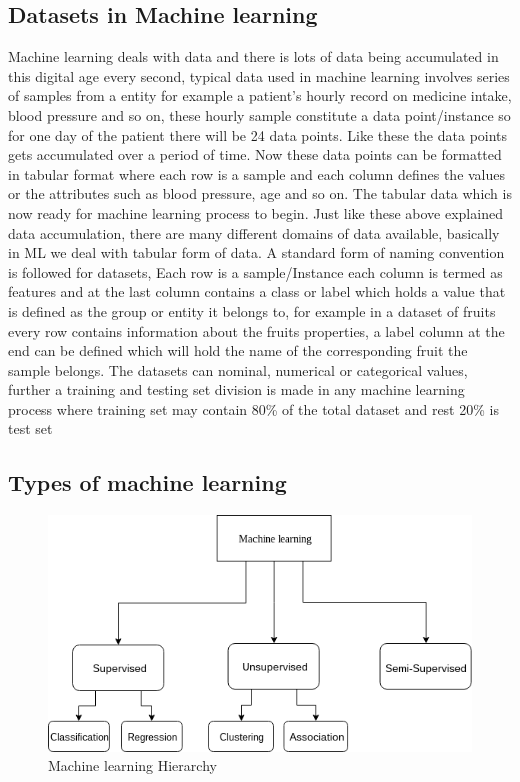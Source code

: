 \subsection{Datasets in Machine learning}
Machine learning deals with data and there is lots of data being accumulated in this digital age every second, typical data used in machine learning involves series of samples from a entity for example a patient's hourly record on medicine intake, blood pressure and so on, these hourly sample constitute a data point/instance so for one day of the patient there will be 24 data points. Like these the data points gets accumulated over a period of time. Now these data points can be formatted in tabular format where each row is a sample and each column defines the values or the attributes such as blood pressure, age and so on. The tabular data which is now ready for machine learning process to begin. Just like these above explained data accumulation, there are many different domains of data available, basically in ML we deal with tabular form of data. A standard form of naming convention is followed for datasets, Each row is a sample/Instance each column is termed as features and at the last column contains a class or label which holds a value that is defined as the group or entity it belongs to, for example in a dataset of fruits every row contains information about the fruits properties, a label column at the end can be defined which will hold the name of the corresponding fruit the sample belongs. The datasets can nominal, numerical or categorical values,  further a training and testing set division is made in any machine learning process where training set may contain 80\% of the total dataset and rest 20\% is test set

\subsection{Types of machine learning}

\begin{figure}[!h]
    	\centering
    	\includegraphics[width=0.9\linewidth]{thesis_template/images/machine_learning.png}
    	\caption{Machine learning Hierarchy}
    	\label{fig:machine_learning}
    \end{figure}
    
